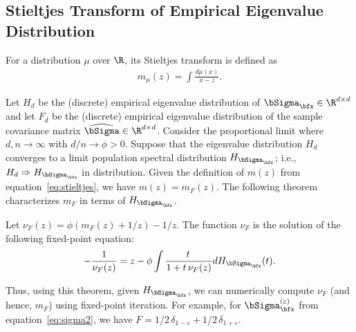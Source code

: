 \subsection{Stieltjes Transform of Empirical Eigenvalue Distribution}
\label{sec:stieltjes}
For a distribution $\mu$ over $\R$, its Stieltjes transform is defined as 
\begin{align*}
    m_\mu(z) = \int\frac{d\mu(x)}{x - z}.
\end{align*}

Let $H_d$ be the (discrete) empirical eigenvalue distribution of $\bSigma_{\bfx} \in \R^{d\times d}$ and let $F_d$ be the (discrete) empirical eigenvalue distribution of the sample covariance matrix $\widehat\bSigma \in \R^{d\times d}$. Consider the proportional limit where $d, n \to \infty$ with $d/n\to \phi>0$. Suppose that the eigenvalue distribution $H_d$ converges to a limit population spectral distribution $H_{\bSigma_{\bfx}}$; i.e., $H_d \Rightarrow H_{\bSigma_{\bfx}}$ in distribution. Given the definition of $m(z)$ from equation~\eqref{eq:stieltjes}, we have $m(z) = m_{F}(z)$. The following theorem characterizes $m_F$ in terms of $H_{\bSigma_{\bfx}}$.

\begin{theorem}
    Let $\nu_F(z) = \phi(m_F(z) + 1/z) - 1/z$. The function $\nu_F$ is the solution of the following fixed-point equation:
    \begin{align*}
        -\frac{1}{\nu_F(z)}=z-\phi \int \frac{t\, }{1+t \,\nu_F(z)} d H_{\bSigma_{\bfx}}(t).
    \end{align*}
\end{theorem}

Thus, using this theorem, given $H_{\bSigma_{\bfx}}$, we can numerically compute $\nu_F$  (and hence, $m_F$) using fixed-point iteration. For example, for $\bSigma_{\bfx}^{(\varepsilon)}$ from equation~\eqref{eq:sigma2}, we have $F = 1/2\, \delta_{1-\varepsilon} + 1/2\, \delta_{1+\varepsilon}$.
